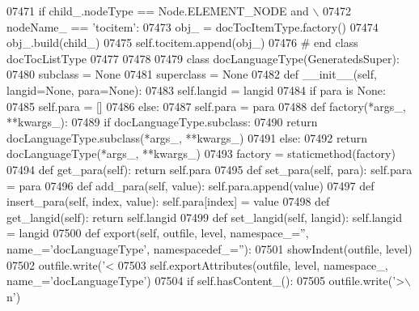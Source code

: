 \begin{DoxyCode}
{{{{{{{{{{{{{{{{{{{{{{{{{{{{{{{{{{{{{{{{{{{{{{{{{{{{{{{{{{{{{{{{{{{{{{{{{{{{{{{{{{{{{{{{{{{{{{{{{{{{{{{{{{{{{{{{{{{{{{{{{{{{{{{{{{{{{{{{{{{{{{{{{{{{{{{{{{{{{{{{{{{{{{{{{{{{{{{{{{{{{{{{{{{{{{{{{{{{{{{{{{{{{{{{{{{{{{{{{{{{{{{{{{{{{{{{{{{{{{{{{{{{{{{{{{{{{{{{{{{{{{{{{{{{{{{{{{{{{{{{{{{{{{{{{{{{{{{{{{{{{{{{{{{{{{{{{{{{{{{{{{{{{{{{{{{{{{{{{{{{{{{{{{{{{{{{{{{{{{{{{{{{{{{{{{{{{{{{{{{{{{{{{{{{{{{{{{{{{{{{{{{{{{{{{{{{{{{{{{{{{{{{{{{{{{{{{{{{{{{{{{{{{{{{{{{{{{{{{{{{{{{{{{{{{{07471         \textcolor{keywordflow}{if} child\_.nodeType == Node.ELEMENT\_NODE \textcolor{keywordflow}{and} \(\backslash\)
07472             nodeName\_ == \textcolor{stringliteral}{'tocitem'}:
07473             obj\_ = docTocItemType.factory()
07474             obj\_.build(child\_)
07475             self.tocitem.append(obj\_)
07476 \textcolor{comment}{# end class docTocListType}
07477 
07478 
07479 \textcolor{keyword}{class }docLanguageType(GeneratedsSuper):
07480     subclass = \textcolor{keywordtype}{None}
07481     superclass = \textcolor{keywordtype}{None}
07482     \textcolor{keyword}{def }__init__(self, langid=None, para=None):
07483         self.langid = langid
07484         \textcolor{keywordflow}{if} para \textcolor{keywordflow}{is} \textcolor{keywordtype}{None}:
07485             self.para = []
07486         \textcolor{keywordflow}{else}:
07487             self.para = para
07488     \textcolor{keyword}{def }factory(*args\_, **kwargs\_):
07489         \textcolor{keywordflow}{if} docLanguageType.subclass:
07490             \textcolor{keywordflow}{return} docLanguageType.subclass(*args\_, **kwargs\_)
07491         \textcolor{keywordflow}{else}:
07492             \textcolor{keywordflow}{return} docLanguageType(*args\_, **kwargs\_)
07493     factory = staticmethod(factory)
07494     \textcolor{keyword}{def }get_para(self): \textcolor{keywordflow}{return} self.para
07495     \textcolor{keyword}{def }set_para(self, para): self.para = para
07496     \textcolor{keyword}{def }add_para(self, value): self.para.append(value)
07497     \textcolor{keyword}{def }insert_para(self, index, value): self.para[index] = value
07498     \textcolor{keyword}{def }get_langid(self): \textcolor{keywordflow}{return} self.langid
07499     \textcolor{keyword}{def }set_langid(self, langid): self.langid = langid
07500     \textcolor{keyword}{def }export(self, outfile, level, namespace\_='', name\_='docLanguageType', namespacedef\_=''):
07501         showIndent(outfile, level)
07502         outfile.write(\textcolor{stringliteral}{'<%
07503         self.exportAttributes(outfile, level, namespace\_, name\_=\textcolor{stringliteral}{'docLanguageType'})
07504         \textcolor{keywordflow}{if} self.hasContent_():
07505             outfile.write(\textcolor{stringliteral}{'>\(\backslash\)n'})
}}}}}}}}}}}}}}}}}}}}}}}}}}}}}}}}}}}}}}}}}}}}}}}}}}}}}}}}}}}}}}}}}}}}}}}}}}}}}}}}}}}}}}}}}}}}}}}}}}}}}}}}}}}}}}}}}}}}}}}}}}}}}}}}}}}}}}}}}}}}}}}}}}}}}}}}}}}}}}}}}}}}}}}}}}}}}}}}}}}}}}}}}}}}}}}}}}}}}}}}}}}}}}}}}}}}}}}}}}}}}}}}}}}}}}}}}}}}}}}}}}}}}}}}}}}}}}}}}}}}}}}}}}}}}}}}}}}}}}}}}}}}}}}}}}}}}}}}}}}}}}}}}}}}}}}}}}}}}}}}}}}}}}}}}}}}}}}}}}}}}}}}}}}}}}}}}}}}}}}}}}}}}}}}}}}}}}}}}}}}}}}}}}}}}}}}}}}}}}}}}}}}}}}}}}}}}}}}}}}}}}}}}}}}}}}}}}}}}}}}}}}}}}}}}}}}}}}}}}}}}}}}}}}}}}}
\end{DoxyCode}
